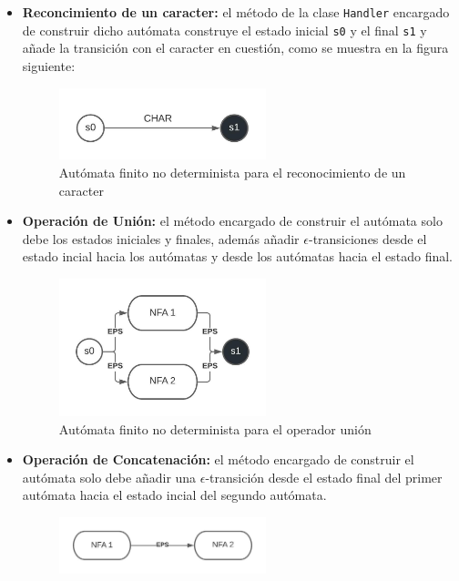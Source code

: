 \begin{itemize}
        \item \textbf{Reconcimiento de un caracter:} el método de la clase \verb|Handler| encargado de construir dicho autómata construye el estado inicial \verb|s0| y el final \verb|s1| y añade la transición con el caracter en cuestión, como se muestra en la figura siguiente:
                \begin{figure}
                        \centering
                        \includegraphics[width=6cm]{./chapters/img/char.jpeg}
                        \caption{Autómata finito no determinista para el reconocimiento de un caracter}
                \end{figure}
        \item \textbf{Operación de Unión:} el método encargado de construir el autómata solo debe los estados iniciales y finales, además añadir $\epsilon$-transiciones desde el estado incial hacia los autómatas y desde los autómatas hacia el estado final.
                \begin{figure}
                        \centering
                        \includegraphics[width=6cm]{./chapters/img/alt.jpeg}
                        \caption{Autómata finito no determinista para el operador unión}
                \end{figure}
        \item \textbf{Operación de Concatenación:} el método encargado de construir el autómata solo debe  añadir una $\epsilon$-transición desde el estado final del primer autómata hacia el estado incial del segundo autómata.
                \begin{figure}
                        \centering
                        \includegraphics[width=6cm]{./chapters/img/concat.jpeg}

\end{figure}
\end{itemize}
